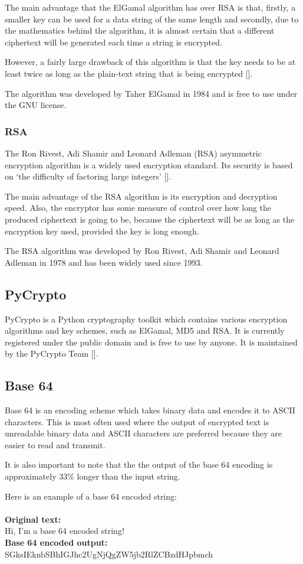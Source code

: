 The main advantage that the ElGamal algorithm has over RSA is that, firstly, a smaller key can
be used for a data string of the same length and secondly, due to the mathematics behind the
algorithm, it is almost certain that a different ciphertext will be generated each time a
string is encrypted.

However, a fairly large drawback of this algorithm is that the key needs to be at least twice
as long as the plain-text string that is being encrypted
[\cite{journal:elgamal}].

The algorithm was developed by Taher ElGamal in 1984 and is free to use under the GNU license.

\subsubsection{RSA}
\label{sec:rsa}

The Ron Rivest, Adi Shamir and Leonard Adleman (RSA) asymmetric encryption algorithm is a
widely used encryption standard. Its security is based on `the difficulty of factoring large 
integers' [\cite{website:elgamal}]. 

The main advantage of the RSA algorithm is its encryption and decryption speed. Also, the
encryptor has some measure of control over how long the produced ciphertext is going to be,
because the ciphertext will be as long as the encryption key used, provided the key is long
enough.

The RSA algorithm was developed by Ron Rivest, Adi Shamir and Leonard Adleman in 1978 and has
been widely used since 1993. 

\subsection{PyCrypto}

PyCrypto is a Python cryptography toolkit which contains various encryption algorithms and
key schemes, such as ElGamal, MD5 and RSA. It is currently registered under the public domain
and is free to use by anyone. It is maintained by the PyCrypto Team [\cite{website:pycrypto}].

\subsection{Base 64}
\label{sec:base64}

Base 64 is an encoding scheme which takes binary data and encodes it to ASCII characters. This
is most often used where the output of encrypted text is unreadable binary data and ASCII
characters are preferred because they are easier to read and transmit. 

It is also important to note that the the output of the base 64 encoding is approximately
33\% longer than the input string.

Here is an example of a base 64 encoded string:\\\\
\textbf{Original text:}\\
Hi, I'm a base 64 encoded string!\\
\textbf{Base 64 encoded output:}\\
SGksIEknbSBhIGJhc2UgNjQgZW5jb2RlZCBzdHJpbmch
